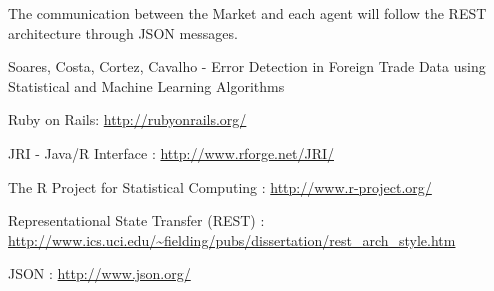 \documentclass{llncs}
\begin{document}
The communication between the Market and each agent will follow the REST architecture \cite{tec:REST} through JSON \cite{tec:JSON} messages.

\begin{thebibliography}{9}
Soares, Costa, Cortez, Cavalho - Error Detection in Foreign Trade Data   using Statistical and Machine Learning Algorithms

Ruby on Rails:
\url{http://rubyonrails.org/}

JRI - Java/R Interface : 
\url{http://www.rforge.net/JRI/}

The R Project for Statistical Computing :
\url{http://www.r-project.org/}

Representational State Transfer (REST) :
\url{http://www.ics.uci.edu/~fielding/pubs/dissertation/rest_arch_style.htm}

JSON :
\url{http://www.json.org/}



\end{thebibliography}
\end{document}
